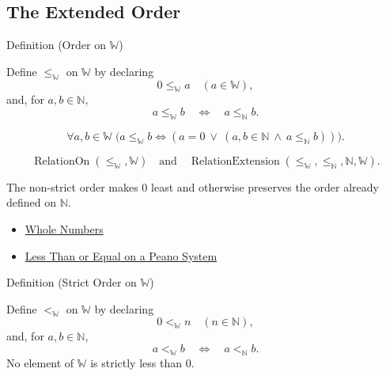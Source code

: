 \subsection*{The Extended Order}

\begin{definitionbox}{Definition (Order on \texorpdfstring{$\mathbb{W}$}{W})}
\begin{definition}
\label{def:order-on-w}
Define $\leq_{\mathbb{W}}$ on $\mathbb{W}$ by declaring
\[
0\leq_{\mathbb{W}}a\quad(a\in\mathbb{W}),
\]
and, for $a,b\in\mathbb{N}$,
\[
a\leq_{\mathbb{W}}b
\quad\Longleftrightarrow\quad
a\leq_{\mathbb{N}}b.
\]
\end{definition}
\end{definitionbox}

\begin{remark*}
\[
\forall a,b\in\mathbb{W}\;
\bigl(a\leq_{\mathbb{W}}b
\Longleftrightarrow
(a=0\ \vee\ (a,b\in\mathbb{N}\ \wedge\ a\leq_{\mathbb{N}}b))\bigr).
\]
\end{remark*}

\begin{remark*}
\[
\operatorname{RelationOn}(\leq_{\mathbb{W}},\mathbb{W})
\quad\text{and}\quad
\operatorname{RelationExtension}
(\leq_{\mathbb{W}},\leq_{\mathbb{N}},\mathbb{N},\mathbb{W}).
\]
\end{remark*}

\begin{remark*}[Interpretation]
The non-strict order makes $0$ least and otherwise preserves the order already
defined on $\mathbb{N}$.
\end{remark*}

\begin{dependencies}
\begin{itemize}
  \item \hyperref[def:whole-numbers]{Whole Numbers}
  \item \hyperref[def:less-than-or-equal-on-peano-system]{Less Than or Equal on a Peano System}
\end{itemize}
\end{dependencies}

\begin{definitionbox}{Definition (Strict Order on \texorpdfstring{$\mathbb{W}$}{W})}
\begin{definition}
\label{def:strict-order-on-w}
Define $<_{\mathbb{W}}$ on $\mathbb{W}$ by declaring
\[
0<_{\mathbb{W}}n\quad(n\in\mathbb{N}),
\]
and, for $a,b\in\mathbb{N}$,
\[
a<_{\mathbb{W}}b
\quad\Longleftrightarrow\quad
a<_{\mathbb{N}}b.
\]
No element of $\mathbb{W}$ is strictly less than $0$.
\end{definition}
\end{definitionbox}

